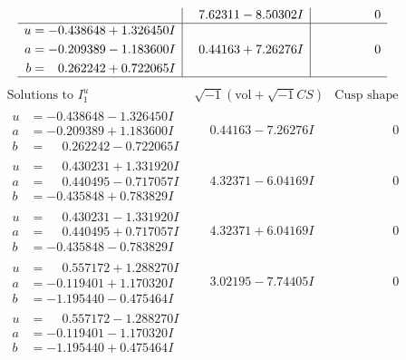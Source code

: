\documentclass[1p]{elsarticle_modified}
\theoremstyle{definition}
\newcommand{\I}{\sqrt{-1}}
\begin{document}
$$\begin{array}{c|c|c}
 & \phantom{-}7.62311 - 8.50302 I & \phantom{-0.000000 } 0 \\ \hline\begin{aligned}
u &= -0.438648 + 1.326450 I \\
a &= -0.209389 - 1.183600 I \\
b &= \phantom{-}0.262242 + 0.722065 I\end{aligned}
 & \phantom{-}0.44163 + 7.26276 I & \phantom{-0.000000 } 0\\
 \hline 
 \end{array}$$\newpage$$\begin{array}{c|c|c}  
\text{Solutions to }I^u_{1}& \I (\text{vol} + \sqrt{-1}CS) & \text{Cusp shape}\\
 \hline 
\begin{aligned}
u &= -0.438648 - 1.326450 I \\
a &= -0.209389 + 1.183600 I \\
b &= \phantom{-}0.262242 - 0.722065 I\end{aligned}
 & \phantom{-}0.44163 - 7.26276 I & \phantom{-0.000000 } 0 \\ \hline\begin{aligned}
u &= \phantom{-}0.430231 + 1.331920 I \\
a &= \phantom{-}0.440495 - 0.717057 I \\
b &= -0.435848 + 0.783829 I\end{aligned}
 & \phantom{-}4.32371 - 6.04169 I & \phantom{-0.000000 } 0 \\ \hline\begin{aligned}
u &= \phantom{-}0.430231 - 1.331920 I \\
a &= \phantom{-}0.440495 + 0.717057 I \\
b &= -0.435848 - 0.783829 I\end{aligned}
 & \phantom{-}4.32371 + 6.04169 I & \phantom{-0.000000 } 0 \\ \hline\begin{aligned}
u &= \phantom{-}0.557172 + 1.288270 I \\
a &= -0.119401 + 1.170320 I \\
b &= -1.195440 - 0.475464 I\end{aligned}
 & \phantom{-}3.02195 - 7.74405 I & \phantom{-0.000000 } 0 \\ \hline\begin{aligned}
u &= \phantom{-}0.557172 - 1.288270 I \\
a &= -0.119401 - 1.170320 I \\
b &= -1.195440 + 0.475464 I\end{aligned}

\end{array}$$
\end{document}
